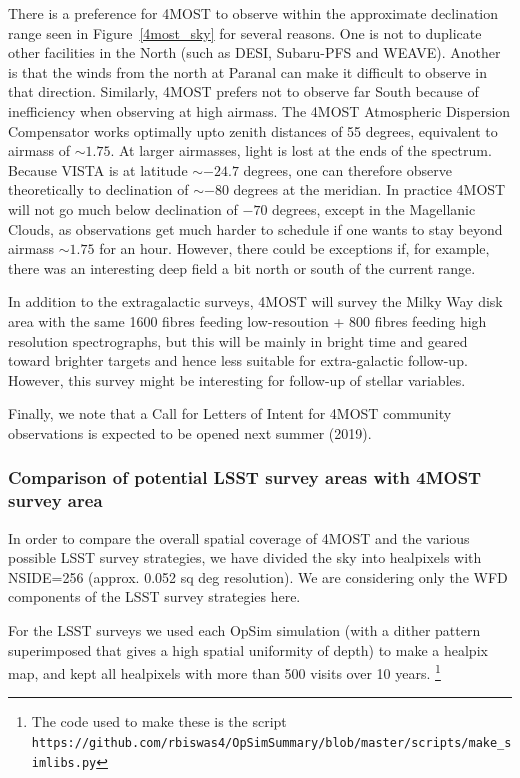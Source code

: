 \documentclass[a4paper,10pt]{article}
\begin{document}
There is a preference for 4MOST to observe within the approximate
declination range seen in Figure~\ref{4most_sky} for several
reasons. One is not to duplicate other facilities in the North (such
as DESI, Subaru-PFS and WEAVE). Another is that the winds from the
north at Paranal can make it difficult to observe in that
direction. Similarly, 4MOST prefers not to observe far South because
of inefficiency when observing at high airmass. The 4MOST Atmospheric
Dispersion Compensator works optimally upto zenith distances of 55
degrees, equivalent to airmass of $\sim1.75$. At larger airmasses,
light is lost at the ends of the spectrum. Because VISTA is at
latitude $\sim -24.7$ degrees, one can therefore observe theoretically
to declination of $\sim -80$ degrees at the meridian. In practice
4MOST will not go much below declination of $-70$ degrees, except in
the Magellanic Clouds, as observations get much harder to schedule if
one wants to stay beyond airmass $\sim 1.75$ for an hour. However,
there could be exceptions if, for example, there was an interesting
deep field a bit north or south of the current range.

In addition to the extragalactic surveys, 4MOST will survey the Milky
Way disk area with the same 1600 fibres feeding low-resoution + 800
fibres feeding high resolution spectrographs, but this will be mainly
in bright time and geared toward brighter targets and hence less
suitable for extra-galactic follow-up. However, this survey might be
interesting for follow-up of stellar variables.

Finally, we note that a Call for Letters of Intent for 4MOST community
observations is expected to be opened next summer (2019).

\subsubsection{Comparison of potential LSST survey areas with 4MOST survey area}

In order to compare the overall spatial coverage of 4MOST and the
various possible LSST survey strategies, we have divided the sky into
healpixels with NSIDE=256 (approx. 0.052 sq deg resolution). We are
considering only the WFD components of the LSST survey strategies
here.
 
For the LSST surveys we used each OpSim simulation (with a dither
pattern superimposed that gives a high spatial uniformity of depth) to
make a healpix map, and kept all healpixels with more than 500 visits
over 10 years.
\footnote{The code used to
  make these is the script
  {\tt https://github.com/rbiswas4/OpSimSummary/blob/master/scripts/make\_simlibs.py}}
\end{document}
